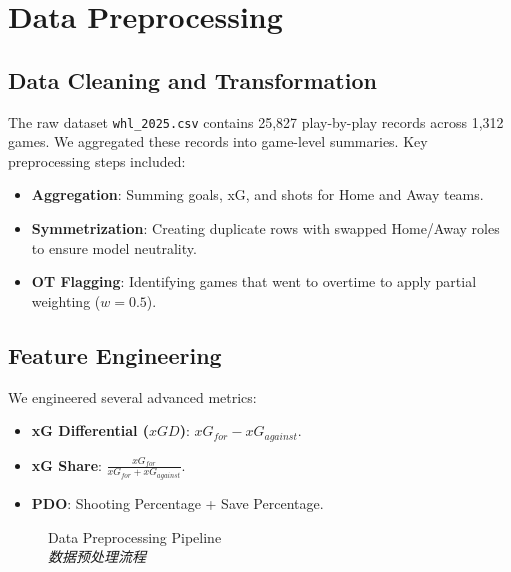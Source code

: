 \documentclass[conference]{IEEEtran}
\newcommand{\bicaption}[2]{\caption{#1 \\ \textit{#2}}}
\begin{document}
\section{Data Preprocessing}
\label{sec:data}
\subsection{Data Cleaning and Transformation}
The raw dataset \texttt{whl\_2025.csv} contains 25,827 play-by-play records across 1,312 games. We aggregated these records into game-level summaries.
Key preprocessing steps included:
\begin{itemize}
    \item \textbf{Aggregation}: Summing goals, xG, and shots for Home and Away teams.
    \item \textbf{Symmetrization}: Creating duplicate rows with swapped Home/Away roles to ensure model neutrality.
    \item \textbf{OT Flagging}: Identifying games that went to overtime to apply partial weighting ($w=0.5$).
\end{itemize}

\subsection{Feature Engineering}
We engineered several advanced metrics:
\begin{itemize}
    \item \textbf{xG Differential ($xGD$)}: $xG_{for} - xG_{against}$.
    \item \textbf{xG Share}: $\frac{xG_{for}}{xG_{for} + xG_{against}}$.
    \item \textbf{PDO}: Shooting Percentage + Save Percentage.
\end{itemize}

\begin{figure}[htbp]
    \centering
    \bicaption{Data Preprocessing Pipeline}{数据预处理流程}
    \label{fig:pipeline}
\end{figure}
\end{document}
